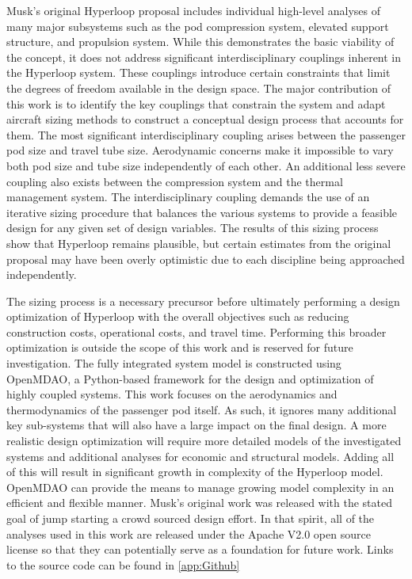 \documentclass[heading.tex]{subfiles}
\begin{document}
Musk's original Hyperloop proposal includes individual high-level analyses of many major subsystems such as the pod compression system,
elevated support structure, and propulsion system. While this demonstrates the basic viability of the concept, it does not address
significant interdisciplinary couplings inherent in the Hyperloop system. These couplings introduce certain constraints that limit the 
degrees of freedom available in the design space. The major contribution of this work is to identify the key couplings that constrain the system
and adapt aircraft sizing methods to construct a conceptual design process that accounts for them. The most significant 
interdisciplinary coupling arises between the passenger pod size and travel tube size. Aerodynamic concerns make it impossible to vary 
both pod size and tube size independently of each other. An additional less severe coupling also exists between the compression system and 
the thermal management system. The interdisciplinary coupling demands the use of an iterative sizing procedure that balances 
the various systems to provide a feasible design for any given set of design variables. The results of this sizing process show that
Hyperloop remains plausible, but certain estimates from the original proposal may have been overly optimistic due to each discipline being approached independently. 

The sizing process is a necessary precursor before ultimately performing a design optimization of 
Hyperloop with the overall objectives such as reducing construction costs, operational costs, and travel time.
Performing this broader optimization 
is outside the scope of this work and is reserved for future investigation. 
The fully integrated system model is constructed using OpenMDAO, a Python-based framework for 
the design and optimization of highly coupled systems\cite{GrayBenchmarking2013}. 
This work focuses on the aerodynamics and thermodynamics of the passenger pod itself.
As such, it ignores many additional key sub-systems that will also have a large impact on the final design.
A more realistic design optimization will require more detailed models of the investigated systems and additional analyses for economic and 
structural models. Adding all of this will result in significant growth in complexity of the Hyperloop model. 
OpenMDAO can provide the means to manage growing model complexity 
in an efficient and flexible manner. Musk's original work was released with the stated goal of jump starting
a crowd sourced design effort. In that spirit, all of the analyses used in this work are released under
the Apache V2.0 open source license so that they can potentially serve as a foundation for future work. 
Links to the source code can be found in \cref{app:Github}
\end{document}
